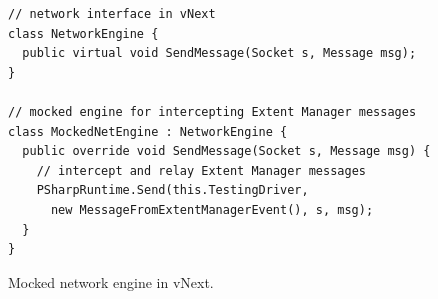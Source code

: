 

%

\begin{figure}[t]
\begin{lstlisting}
// network interface in vNext
class NetworkEngine {
  public virtual void SendMessage(Socket s, Message msg);
}

// mocked engine for intercepting Extent Manager messages
class MockedNetEngine : NetworkEngine {
  public override void SendMessage(Socket s, Message msg) {
    // intercept and relay Extent Manager messages
    PSharpRuntime.Send(this.TestingDriver,
      new MessageFromExtentManagerEvent(), s, msg);
  }
}
\end{lstlisting}
\vspace{-2mm}
\caption{Mocked network engine in vNext.}
\label{fig:enginecode}
\end{figure}


